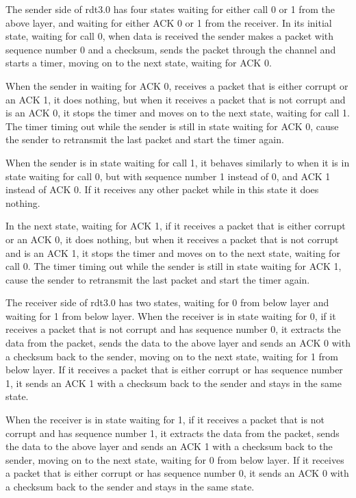 \documentclass[12pt letter]{report}
\begin{document}
The sender side of rdt3.0 has four states waiting for either call 0
or 1 from the above layer, and waiting for either ACK 0 or 1 from the
receiver. In its initial state, waiting for call 0, when data is
received the sender makes a packet with sequence number 0 and a
checksum, sends the packet through the channel and starts a timer,
moving on to the next state, waiting for ACK 0.

When the sender in waiting for ACK 0, receives a packet that is
either corrupt or an ACK 1, it does nothing, but when it receives a
packet that is not corrupt and is an ACK 0, it stops the timer and
moves on to the next state, waiting for call 1. The timer timing out
while the sender is still in state waiting for ACK 0, cause the
sender to retransmit the last packet and start the timer again.

When the sender is in state waiting for call 1, it behaves similarly to
when it is in state waiting for call 0, but with sequence number 1
instead of 0, and ACK 1 instead of ACK 0. If it receives any other
packet while in this state it does nothing.

In the next state, waiting for ACK 1, if it receives a packet that is
either corrupt or an ACK 0, it does nothing, but when it receives a
packet that is not corrupt and is an ACK 1, it stops the timer and
moves on to the next state, waiting for call 0. The timer timing out
while the sender is still in state waiting for ACK 1, cause the
sender to retransmit the last packet and start the timer again.

The receiver side of rdt3.0 has two states, waiting for 0 from below
layer and waiting for 1 from below layer. When the receiver is in state
waiting for 0, if it receives a packet that is not corrupt and has
sequence number
0, it extracts the data from the packet, sends the data to the above
layer and sends an ACK 0 with a checksum back to the sender, moving
on to the next state, waiting for 1 from below layer. If it receives
a packet that is either corrupt or has sequence number 1, it sends an
ACK 1 with a checksum back to the sender and stays in the same state.

When the receiver is in state waiting for 1, if it receives a packet
that is not corrupt and has sequence number 1, it extracts the data
from the packet, sends the data to the above layer and sends an ACK 1
with a checksum back to the sender, moving on to the next state,
waiting for 0 from below layer. If it receives a packet that is
either corrupt or has sequence number 0, it sends an ACK 0 with a
checksum back to the sender and stays in the same state.
\end{document}
